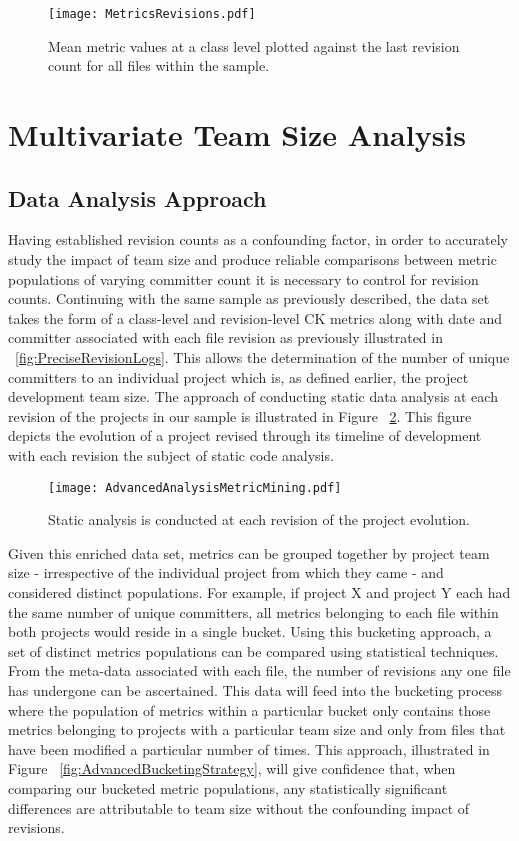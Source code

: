 \begin{figure}[htbp!] 
\centering    
\texttt{[image: MetricsRevisions.pdf]}
\caption{Mean metric values at a class level plotted against the last revision count for all files within the sample.}
\label{fig:MetricsRevisions}
\end{figure}

\section{Multivariate Team Size Analysis} %

\subsection{Data Analysis Approach}
Having established revision counts as a confounding factor, in order to accurately study the impact of team size and produce reliable comparisons between metric populations of varying committer count it is necessary to control for revision counts. Continuing with the same sample as previously described, the data set takes the form of a class-level and revision-level CK metrics along with date and committer associated with each file revision as previously illustrated in ~\ref{fig:PreciseRevisionLogs}. This allows the determination of the number of unique committers to an individual project which is, as defined earlier, the project development team size. The approach of conducting static data analysis at each revision of the projects in our sample is illustrated in Figure ~\ref{fig:AdvancedAnalysisMetricMining}. This figure depicts the evolution of a project revised through its timeline of development with each revision the subject of static code analysis. 

\begin{figure}[htbp!] 
\centering    
\texttt{[image: AdvancedAnalysisMetricMining.pdf]}
\caption{Static analysis is conducted at each revision of the project evolution.}
\label{fig:AdvancedAnalysisMetricMining}
\end{figure}

Given this enriched data set, metrics can be grouped together by project team size - irrespective of the individual project from which they came - and considered distinct populations. For example, if project X and project Y each had the same number of unique committers, all metrics belonging to each file within both projects would reside in a single bucket. Using this bucketing approach, a set of distinct metrics populations can be compared using statistical techniques. From the meta-data associated with each file, the number of revisions any one file has undergone can be ascertained. This data will feed into the bucketing process where the population of metrics within a particular bucket only contains those metrics belonging to projects with a particular team size and only from files that have been modified a particular number of times. This approach, illustrated in Figure ~\ref{fig:AdvancedBucketingStrategy}, will give confidence that, when comparing our bucketed metric populations, any statistically significant differences are attributable to team size without the confounding impact of revisions.

